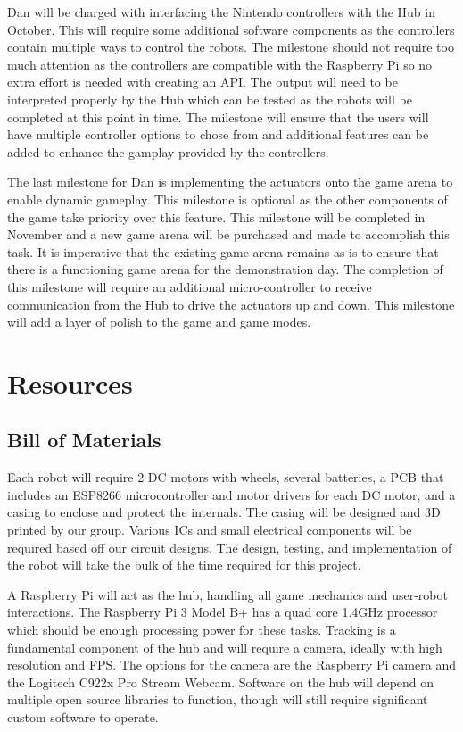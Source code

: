 \documentclass[11pt]{ieeeconf}
\begin{document}
Dan will be charged with interfacing the Nintendo controllers with the Hub in October. This will require some additional software components as the controllers contain multiple ways to control the robots. The milestone should not require too much attention as the controllers are compatible with the Raspberry Pi so no extra effort is needed with creating an API. The output will need to be interpreted properly by the Hub which can be tested as the robots will be completed at this point in time. The milestone will ensure that the users will have multiple controller options to chose from and additional features can be added to enhance the gamplay provided by the controllers.

The last milestone for Dan is implementing the actuators onto the game arena to enable dynamic gameplay. This milestone is optional as the other components of the game take priority over this feature. This milestone will be completed in November and a new game arena will be purchased and made to accomplish this task. It is imperative that the existing game arena remains as is to ensure that there is a functioning game arena for the demonstration day. The completion of this milestone will require an additional micro-controller to receive communication from the Hub to drive the actuators up and down. This milestone will add a layer of polish to the game and game modes.

\section{Resources}
\subsection{Bill of Materials}

Each robot will require 2 DC motors with wheels, several batteries, a PCB that includes an ESP8266 microcontroller and motor drivers for each DC motor, and a casing to enclose and protect the internals. The casing will be designed and 3D printed by our group. Various ICs and small electrical components will be required based off our circuit designs. The design, testing, and implementation of the robot will take the bulk of the time required for this project.

A Raspberry Pi will act as the hub, handling all game mechanics and user-robot interactions. The Raspberry Pi 3 Model B+ has a quad core 1.4GHz processor which should be enough processing power for these tasks. Tracking is a fundamental component of the hub and will require a camera, ideally with high resolution and FPS. The options for the camera are the Raspberry Pi camera and the Logitech C922x Pro Stream Webcam. Software on the hub will depend on multiple open source libraries to function, though will still require significant custom software to operate.
\end{document}
